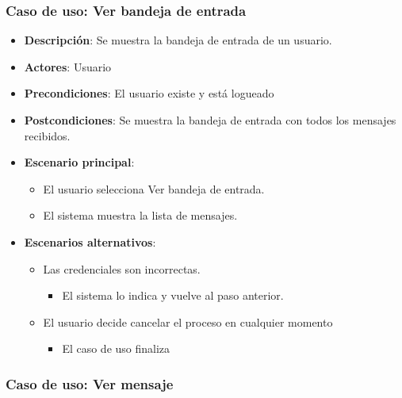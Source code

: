 \documentclass[12pt,a4paperpaper,]{report}
\providecommand{\tightlist}{%
  \setlength{\itemsep}{0pt}\setlength{\parskip}{0pt}}
\begin{document}
\subsubsection{Caso de uso: Ver bandeja de
entrada}\label{caso-de-uso-ver-bandeja-de-entrada}

\begin{itemize}
\tightlist
\item
  \textbf{Descripción}: Se muestra la bandeja de entrada de un usuario.
\item
  \textbf{Actores}: Usuario
\item
  \textbf{Precondiciones}: El usuario existe y está logueado
\item
  \textbf{Postcondiciones}: Se muestra la bandeja de entrada con todos
  los mensajes recibidos.
\item
  \textbf{Escenario principal}:

  \begin{itemize}
  \tightlist
  \item
    El usuario selecciona Ver bandeja de entrada.
  \item
    El sistema muestra la lista de mensajes.
  \end{itemize}
\item
  \textbf{Escenarios alternativos}:

  \begin{itemize}
  \tightlist
  \item
    Las credenciales son incorrectas.

    \begin{itemize}
    \tightlist
    \item
      El sistema lo indica y vuelve al paso anterior.
    \end{itemize}
  \item
    El usuario decide cancelar el proceso en cualquier momento

    \begin{itemize}
    \tightlist
    \item
      El caso de uso finaliza
    \end{itemize}
  \end{itemize}
\end{itemize}

\subsubsection{Caso de uso: Ver mensaje}\label{caso-de-uso-ver-mensaje}
\end{document}
